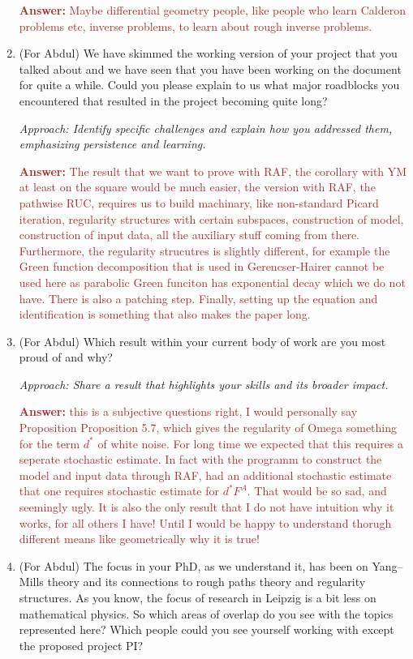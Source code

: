 \documentclass[12pt]{article}
\numberwithin{equation}{section}
\newcommand{\brown}[1]{\textcolor{brown}{#1}}
\newcommand{\blue}[1]{\textcolor{blueblue}{#1}}
\begin{document}
\begin{enumerate}
    \brown{\textbf{Answer:} Maybe differential geometry people, like people who learn Calderon problems etc, inverse problems, to learn about rough inverse problems. }

     \item \blue{(For Abdul)}  We have skimmed the working version of your project that you talked about and we have seen that you have been working on the document for quite a while. Could you please explain to us what major roadblocks you encountered that resulted in the project becoming quite long?
    
    \textit{Approach: Identify specific challenges and explain how you addressed them, emphasizing persistence and learning.}

    \brown{\textbf{Answer:} The result that we want to prove with RAF, the corollary with YM at least on the square would be much easier, the version with RAF, the pathwise RUC, requires us to build machinary, like non-standard Picard iteration, regularity structures with certain subspaces, construction of model, construction of input data, all the auxiliary stuff coming from there. Furthermore, the regularity strucutres is slightly different, for example the Green function decomposition that is used in Gerencser-Hairer cannot be used here as parabolic Green funciton has exponential decay which we do not have. There is also a patching step. Finally, setting up the equation and identification is something that also makes the paper long. }
    
    \item  \blue{(For Abdul)}  Which result within your current body of work are you most proud of and why?
    
    \textit{Approach: Share a result that highlights your skills and its broader impact.}

    \brown{\textbf{Answer:} this is a subjective questions right, I would personally say Proposition  Proposition 5.7, which gives the regularity of Omega something for the term $d^*$ of white noise. For long time we expected that this requires a seperate stochastic estimate. In fact with the programm to construct the model and input data through RAF, had an additional stochastic estimate that one requires stochastic estimate for $d^*F^A$. That would be so sad, and seemingly ugly. It is also the only result that I do not have intuition why it works, for all others I have! Until I would be happy to understand thorugh different means like geometrically why it is true!}

    \item \blue{(For Abdul)}  The focus in your PhD, as we understand it, has been on Yang–Mills theory and its connections to rough paths theory and regularity structures. As you know, the focus of research in Leipzig is a bit less on mathematical physics. So which areas of overlap do you see with the topics represented here? Which people could you see yourself working with except the proposed project PI?
    

\end{enumerate}
\end{document}
